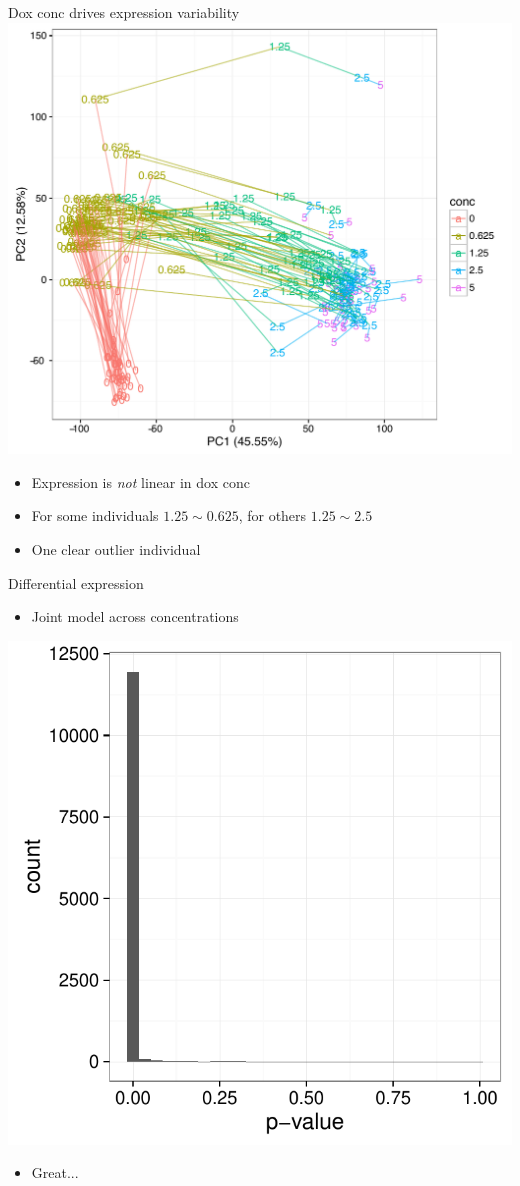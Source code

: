 \documentclass{beamer}
\begin{document}
\begin{frame}{Dox conc drives expression variability}
\centering
\includegraphics[width=.6\textwidth,clip,trim=0 0 0 0]{../figures/pca.pdf}
\begin{itemize}
\item Expression is \emph{not} linear in dox conc
\item For some individuals $1.25 \sim 0.625$, for others $1.25 \sim 2.5$
\item One clear outlier individual
\end{itemize}
\end{frame}

\begin{frame}{Differential expression}
\begin{itemize}
\item Joint model across concentrations
\end{itemize}
\centering
\includegraphics[width=.6\textwidth,clip,trim=0 0 0 0]{../figures/de_boring.pdf}
\begin{itemize}
\item Great... 
\end{itemize}
\end{frame}
\end{document}

